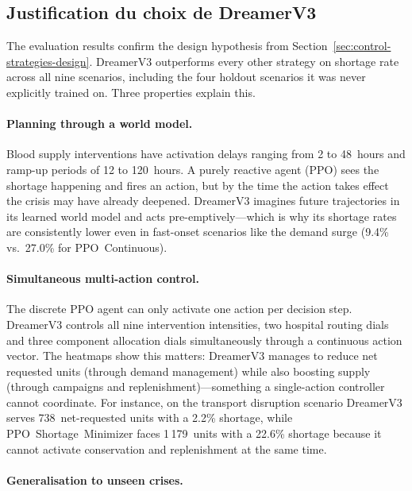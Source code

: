 \subsection{Justification du choix de DreamerV3}
\label{sec:dreamerv3-justification}

The evaluation results confirm the design hypothesis from
Section~\ref{sec:control-strategies-design}.  DreamerV3 outperforms every
other strategy on shortage rate across all nine scenarios, including the
four holdout scenarios it was never explicitly trained on.  Three properties
explain this.

\paragraph{Planning through a world model.}

Blood supply interventions have activation delays ranging from 2 to
48~hours and ramp-up periods of 12 to 120~hours.  A purely reactive agent
(PPO) sees the shortage happening and fires an action, but by the time the
action takes effect the crisis may have already deepened.  DreamerV3
imagines future trajectories in its learned world model and acts
pre-emptively---which is why its shortage rates are consistently lower even
in fast-onset scenarios like the demand surge (9.4\% vs.\ 27.0\% for
PPO~Continuous).

\paragraph{Simultaneous multi-action control.}

The discrete PPO agent can only activate one action per decision step.
DreamerV3 controls all nine intervention intensities, two hospital routing
dials and three component allocation dials simultaneously through a
continuous action vector.  The heatmaps show this matters: DreamerV3
manages to reduce net requested units (through demand management) while
also boosting supply (through campaigns and replenishment)---something a
single-action controller cannot coordinate.  For instance, on the transport
disruption scenario DreamerV3 serves 738~net-requested units with a 2.2\%
shortage, while PPO~Shortage~Minimizer faces 1\,179~units with a 22.6\%
shortage because it cannot activate conservation and replenishment at the
same time.

\paragraph{Generalisation to unseen crises.}

